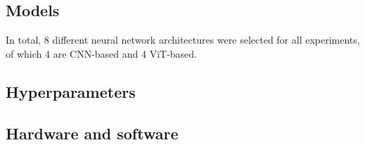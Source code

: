 \subsection{Models}
In total, 8 different neural network architectures were selected for all experiments, of which 4 are CNN-based and 4 ViT-based.


\subsection{Hyperparameters}


\subsection{Hardware and software}
